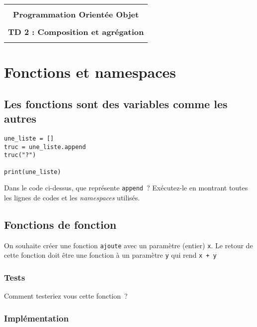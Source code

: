 \documentclass[12pt]{article}
\begin{document}
    \begin{center}
      \begin{tabular}{c}
      \hline
    \\
        {\bf \textsf {\Large Programmation Orientée Objet}}\\
    \\
        {\bf \textsf {\Large TD 2 : Composition et agrégation}}\\
    \\
        \hline
      \end{tabular}
    \end{center}
    \vspace{15mm}

\section{Fonctions et namespaces}

\subsection{Les fonctions sont des variables comme les autres}


\lstset{language=Python}
\begin{lstlisting}
une_liste = []
truc = une_liste.append
truc("?")

print(une_liste)
\end{lstlisting}


Dans le code ci-dessus, que représente \verb|append|~? Exécutez-le en montrant toutes les lignes de codes et les {\em namespaces} utilisés.


\subsection{Fonctions de fonction}

On souhaite créer une fonction \verb|ajoute| avec un paramètre (entier) \verb|x|. Le retour de cette fonction doit être une fonction à un paramètre \verb|y| qui rend \verb|x + y|

\subsubsection{Tests}

Comment testeriez vous cette fonction~?

\subsubsection{Implémentation}
\end{document}
